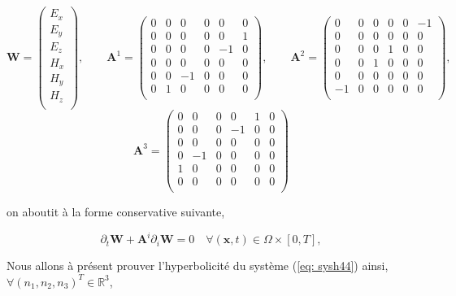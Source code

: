 \documentclass[a4paper,oneside,10pt]{report}
\begin{document}
\begin{equation}
\mathbf{W}=
\begin{pmatrix}
E_x\\
E_y\\
E_z\\
H_x\\
H_y\\
H_z\\
\end{pmatrix},
\qquad
\mathbf{A}^1=
\begin{pmatrix}
0 & 0 & 0 & 0 & 0 & 0\\
0 & 0 & 0 & 0 & 0 & 1\\
0 & 0 & 0 & 0 & -1 & 0\\
0 & 0 & 0 & 0 & 0 & 0\\
0 & 0 & -1 & 0 & 0 & 0\\
0 & 1 & 0 & 0 & 0 & 0\\
\end{pmatrix},
\qquad
\mathbf{A}^2=
\begin{pmatrix}
0 & 0 & 0 & 0 & 0 & -1\\
0 & 0 & 0 & 0 & 0 & 0\\
0 & 0 & 0 & 1 & 0 & 0\\
0 & 0 & 1 & 0 & 0 & 0\\
0 & 0 & 0 & 0 & 0 & 0\\
-1 & 0 & 0 & 0 & 0 & 0\\
\end{pmatrix},
\end{equation}
\begin{equation}
\mathbf{A}^3=
\begin{pmatrix}
0 & 0 & 0 & 0 & 1 & 0\\
0 & 0 & 0 & -1 & 0 & 0\\
0 & 0 & 0 & 0 & 0 & 0\\
0 & -1 & 0 & 0 & 0 & 0\\
1 & 0 & 0 & 0 & 0 & 0\\
0 & 0 & 0 & 0 & 0 & 0\\
\end{pmatrix}
\end{equation}


on aboutit à la forme conservative suivante,

\begin{equation}
\label{eq:sysh44}
\partial_t \mathbf{W} +  \mathbf{A}^i\partial_i \mathbf{W} = 0 \quad \forall (\mathbf{x},t) \in \Omega \times [0,T],
\end{equation}

Nous allons à présent prouver l'hyperbolicité du système (\ref{eq: sysh44}) ainsi, $\forall (n_1,n_2,n_3)^T \in \mathbb{R}^3$,
\end{document}
